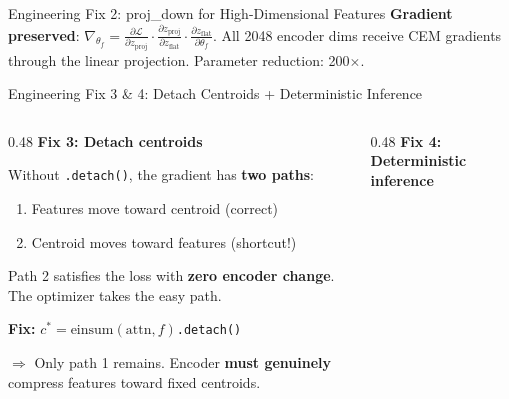 \documentclass[aspectratio=169, 10pt]{beamer}
\newcommand{\code}[1]{\texttt{\small #1}}
\newcommand{\good}[1]{\textcolor{goodgreen}{#1}}
\newcommand{\bad}[1]{\textcolor{bugred}{#1}}
\begin{document}
\begin{frame}{Engineering Fix 2: proj\_down for High-Dimensional Features}
\vspace{0.1cm}
\footnotesize
\textbf{Gradient preserved}: $\nabla_{\theta_f} = \frac{\partial \mathcal{L}}{\partial z_{\text{proj}}} \cdot \frac{\partial z_{\text{proj}}}{\partial z_{\text{flat}}} \cdot \frac{\partial z_{\text{flat}}}{\partial \theta_f}$. All 2048 encoder dims receive CEM gradients through the linear projection. Parameter reduction: \bad{200$\times$}.

\end{frame}

\begin{frame}{Engineering Fix 3 \& 4: Detach Centroids + Deterministic Inference}

\begin{columns}[T]
\begin{column}{0.48\textwidth}
\textbf{Fix 3: Detach centroids}

\vspace{0.1cm}
\small
Without \code{.detach()}, the gradient has \textbf{two paths}:
\begin{enumerate}
    \item Features move toward centroid \good{(correct)}
    \item Centroid moves toward features \bad{(shortcut!)}
\end{enumerate}

Path 2 satisfies the loss with \textbf{zero encoder change}. The optimizer takes the easy path.

\vspace{0.1cm}
\textbf{Fix:} $c^* = \text{einsum}(\text{attn}, f)$\code{.detach()}

\vspace{0.05cm}
$\Rightarrow$ Only path 1 remains. Encoder \textbf{must genuinely} compress features toward fixed centroids.

\vspace{0.15cm}
\end{column}
\begin{column}{0.48\textwidth}
\textbf{Fix 4: Deterministic inference}


\end{column}
\end{columns}
\end{frame}
\end{document}
